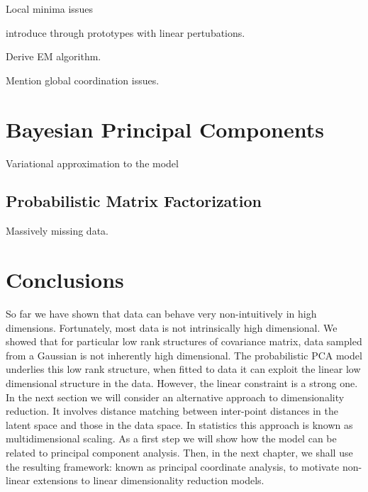 Local minima issues

introduce through prototypes with linear pertubations.

Derive EM algorithm.

Mention global coordination issues.

\section{Bayesian Principal Components}

Variational approximation to the model

\subsection{Probabilistic Matrix Factorization}

Massively missing data.

\section{Conclusions}

So far we have shown that data can behave very non-intuitively in high
dimensions. Fortunately, most data is not intrinsically high
dimensional. We showed that for particular low rank structures of
covariance matrix, data sampled from a Gaussian is not inherently high
dimensional. The probabilistic PCA model underlies this low rank
structure, when fitted to data it can exploit the linear low
dimensional structure in the data. However, the linear constraint is a
strong one. In the next section we will consider an alternative
approach to dimensionality reduction. It involves distance matching
between inter-point distances in the latent space and those in the data
space. In statistics this approach is known as multidimensional
scaling. As a first step we will show
how the model can be related to principal component analysis. Then, in
the next chapter, we shall use the resulting framework: known as
principal coordinate analysis, to motivate non-linear extensions to
linear dimensionality reduction models.





